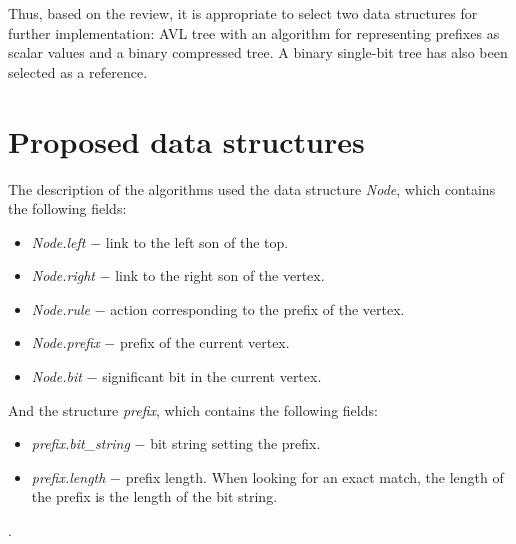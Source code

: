 \documentclass[conference]{IEEEtran}
\begin{document}
        Thus, based on the review, it is appropriate to select two data structures for further implementation: 
        AVL tree with an algorithm for representing prefixes as scalar values and a binary compressed tree. 
        A binary single-bit tree has also been selected as a reference.

\section{Proposed data structures}
    \label{section:trees}
        The description of the algorithms used the data structure \emph{Node}, which contains the following fields:
        \begin{itemize}
            \item \emph{Node.left} $-$ link to the left son of the top.
            \item \emph{Node.right} $-$ link to the right son of the vertex.
            \item \emph{Node.rule} $-$ action corresponding to the prefix of the vertex.
            \item \emph{Node.prefix} $-$ prefix of the current vertex.
            \item \emph{Node.bit} $-$ significant bit in the current vertex.
        \end{itemize}
        And the structure \emph{prefix}, which contains the following fields:
        \begin{itemize}
            \item \emph{prefix.bit\_string} $-$ bit string setting the prefix.
            \item \emph{prefix.length} $-$ prefix length. When looking for an exact match, 
                the length of the prefix is the length of the bit string.
        \end{itemize}.
    
\end{document}
